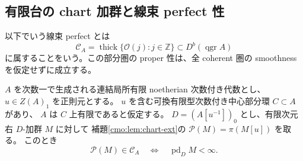 \subsection{有限台の chart 加群と線束 perfect 性}

以下でいう線束 perfect とは
\[
 \mathcal C_A=\operatorname{thick}\{\mathcal O(j):j\in\mathbb Z\}
 \subset D^b(\operatorname{qgr}A)
\]
に属することをいう。この部分圏の proper 性は、全 coherent 圏の
smoothness を仮定せずに成立する。

\begin{lemma}
\label{cmo:lem:finite-support-perfect}
$A$ を次数一で生成される連結局所有限 noetherian 次数付き代数とし、
$u\in Z(A)_1$ を正則元とする。
$u$ を含む可換有限型次数付き中心部分環 $C\subset A$ があり、
$A$ は $C$ 上有限であると仮定する。
$D=(A[u^{-1}])_0$ とし、有限次元右 $D$-加群 $M$ に対して
補題\ref{cmo:lem:chart-ext}の $\mathcal P(M)=\pi(M[u])$ を取る。
このとき
\begin{equation}\label{cmo:eq:chart-perfect-iff}
 \mathcal P(M)\in\mathcal C_A
 \quad\Longleftrightarrow\quad
 \operatorname{pd}_{D}M<\infty.
\end{equation}
\end{lemma}
